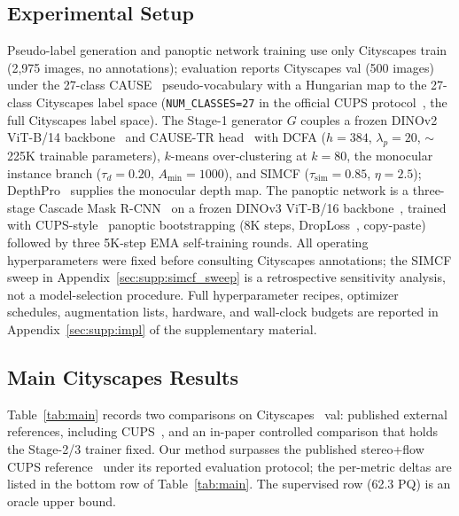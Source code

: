 \documentclass{article}
\begin{document}
\subsection{Experimental Setup}
\label{sec:exp:setup}

Pseudo-label generation and panoptic network training use only Cityscapes train~\cite{cordts2016cityscapes} (2{,}975 images, no annotations); evaluation reports Cityscapes val (500 images) under the 27-class CAUSE~\cite{kim2024cause} pseudo-vocabulary with a Hungarian map to the 27-class Cityscapes label space (\texttt{NUM\_CLASSES=27} in the official CUPS protocol~\cite{hahn2025cups}, the full Cityscapes label space). The Stage-1 generator $G$ couples a frozen DINOv2 ViT-B/14 backbone~\cite{oquab2024dinov2} and CAUSE-TR head~\cite{kim2024cause} with DCFA ($h{=}384$, $\lambda_p{=}20$, $\sim$225K trainable parameters), $k$-means over-clustering at $k{=}80$, the monocular instance branch ($\tau_d{=}0.20$, $A_\text{min}{=}1000$), and SIMCF ($\tau_\text{sim}{=}0.85$, $\eta{=}2.5$); DepthPro~\cite{bochkovskii2024depthpro} supplies the monocular depth map. The panoptic network is a three-stage Cascade Mask R-CNN~\cite{cai2018cascade} on a frozen DINOv3 ViT-B/16 backbone~\cite{simeoni2025dinov3}, trained with CUPS-style~\cite{hahn2025cups} panoptic bootstrapping (8K steps, DropLoss~\cite{wang2023cutler}, copy-paste) followed by three 5K-step EMA self-training rounds. All operating hyperparameters were fixed before consulting Cityscapes annotations; the SIMCF sweep in Appendix~\ref{sec:supp:simcf_sweep} is a retrospective sensitivity analysis, not a model-selection procedure. Full hyperparameter recipes, optimizer schedules, augmentation lists, hardware, and wall-clock budgets are reported in Appendix~\ref{sec:supp:impl} of the supplementary material.


\subsection{Main Cityscapes Results}
\label{sec:exp:main}

Table~\ref{tab:main} records two comparisons on Cityscapes~\cite{cordts2016cityscapes} val: published external references, including CUPS~\cite{hahn2025cups}, and an in-paper controlled comparison that holds the Stage-2/3 trainer fixed. Our method surpasses the published stereo+flow CUPS reference~\cite{hahn2025cups} under its reported evaluation protocol; the per-metric deltas are listed in the bottom row of Table~\ref{tab:main}. The supervised row (62.3 PQ) is an oracle upper bound.
\end{document}

